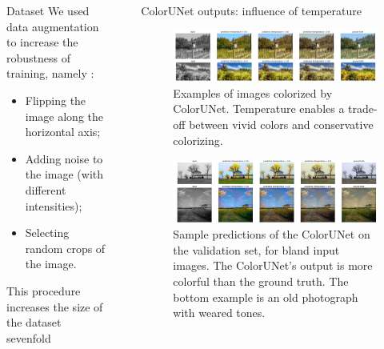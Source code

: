 \documentclass[final]{beamer}
\newlength{\sepwid}
\newlength{\onecolwid}
\newlength{\twocolwid}
\begin{document}
\begin{frame}[t]
\begin{columns}[t]
\begin{column}{\onecolwid}
\begin{block}{Dataset}
We used data augmentation to increase the robustness of training, namely :
\begin{itemize}
\item Flipping the image along the horizontal axis;
\item Adding noise to the image (with different intensities);
\item Selecting random crops of the image.
\end{itemize}
This procedure increases the size of the dataset sevenfold
\end{block}



\end{column} %




\begin{column}{\sepwid}\end{column} %


\begin{column}{\twocolwid} %

  \begin{block}{ColorUNet outputs: influence of temperature}

  \begin{figure}
  \begin{center}
  \includegraphics[width=.8\twocolwid]{img/good_cropped.png}
  \caption{Examples of images colorized by ColorUNet. Temperature enables a trade-off between vivid colors and conservative colorizing.}
  \label{good}
  \end{center}
  \end{figure}

  \begin{figure}
  \begin{center}
  \includegraphics[width=.8\twocolwid]{img/better_cropped}
  \caption{Sample predictions of the ColorUNet on the validation set, for bland input images. The ColorUNet’s output is more colorful than the ground truth. The bottom example is an old photograph with weared tones.}
  \label{better}
  \end{center}
  \end{figure}


\end{block}
\end{column}
\end{columns}
\end{frame}
\end{document}
